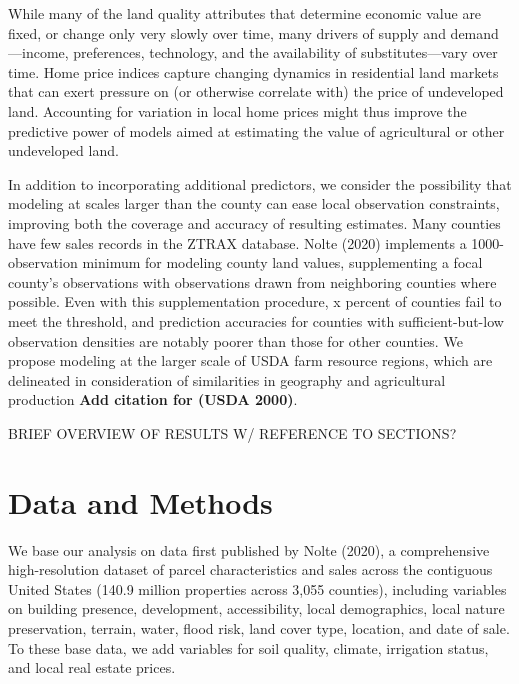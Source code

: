 \documentclass[12pt]{article}
\begin{document}
While many of the land quality attributes that determine economic value are fixed, or change only very slowly over time, many drivers of supply and demand—income, preferences, technology, and the availability of substitutes---vary over time. Home price indices capture changing dynamics in residential land markets that can exert pressure on (or otherwise correlate with) the price of undeveloped land. Accounting for variation in local home prices might thus improve the predictive power of models aimed at estimating the value of agricultural or other undeveloped land. 

In addition to incorporating additional predictors, we consider the possibility that modeling at scales larger than the county can ease local observation constraints, improving both the coverage and accuracy of resulting estimates. Many counties have few sales records in the ZTRAX database. Nolte (2020) implements a 1000-observation minimum for modeling county land values, supplementing a focal county’s observations with observations drawn from neighboring counties where possible. Even with this supplementation procedure, x percent of counties fail to meet the threshold, and prediction accuracies for counties with sufficient-but-low observation densities are notably poorer than those for other counties. We propose modeling at the larger scale of USDA farm resource regions, which are delineated in consideration of similarities in geography and agricultural production \textbf{Add citation for (USDA 2000)}.

BRIEF OVERVIEW OF RESULTS W/ REFERENCE TO SECTIONS? 


\section{Data and Methods}
We base our analysis on data first published by Nolte (2020), a comprehensive high-resolution dataset of parcel characteristics and sales across the contiguous United States (140.9 million properties across 3,055 counties), including variables on building presence, development, accessibility, local demographics, local nature preservation, terrain, water, flood risk, land cover type, location, and date of sale. To these base data, we add variables for soil quality, climate, irrigation status, and local real estate prices.
\end{document}
